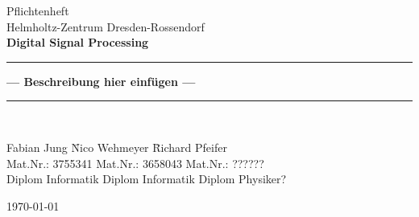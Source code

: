 \documentclass[paper=a4, headings=small]{scrartcl}
\begin{document}
\begin{titlepage}
\begin{center}
	\large{Pflichtenheft\\ Helmholtz-Zentrum Dresden-Rossendorf } \\[10mm]
	\textbf{\Large{Digital Signal Processing}}\\[5mm]
	\rule{\linewidth}{0.5mm}
	\textbf{\LARGE{ --- Beschreibung hier einfügen ---}}
	\rule{\linewidth}{0.5mm}\\[3cm]

\parbox{0cm}{
\begin{tabbing}
  Fabian Jung	              \hspace{2cm}	\= Nico Wehmeyer  \hspace{2cm}	\= Richard Pfeifer\\
  Mat.Nr.:  3755341                         \> Mat.Nr.: 3658043			    \> Mat.Nr.: ??????\\
  Diplom Informatik 			            \> Diplom Informatik     	    \> Diplom Physiker?\\
\end{tabbing}
}

\vfill
{\large \today}
\end{center}

\end{titlepage}

\tableofcontents
\newpage

\newpage
%
\newpage
%
\end{document}
